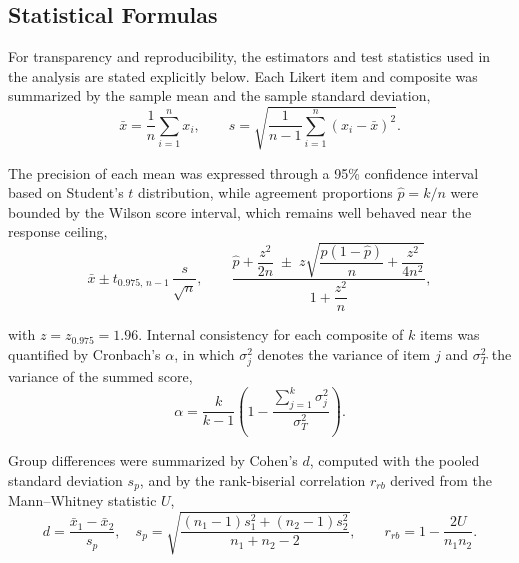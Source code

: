 \subsection{Statistical Formulas}

For transparency and reproducibility, the estimators and test statistics used in the analysis are stated explicitly below. Each Likert item and composite was summarized by the sample mean and the sample standard deviation,
\begin{equation}
  \label{eqn:mean_sd}
  \bar{x} = \frac{1}{n}\sum_{i=1}^{n} x_i,
  \qquad
  s = \sqrt{\frac{1}{n-1}\sum_{i=1}^{n}\left(x_i-\bar{x}\right)^2}.
\end{equation}
The precision of each mean was expressed through a 95\% confidence interval based on Student's $t$ distribution, while agreement proportions $\hat{p}=k/n$ were bounded by the Wilson score interval, which remains well behaved near the response ceiling,
\begin{equation}
  \label{eqn:ci_wilson}
  \bar{x} \pm t_{0.975,\,n-1}\,\frac{s}{\sqrt{n}},
  \qquad
  \frac{\hat{p}+\dfrac{z^2}{2n}\;\pm\; z\sqrt{\dfrac{\hat{p}\left(1-\hat{p}\right)}{n}+\dfrac{z^2}{4n^2}}}{1+\dfrac{z^2}{n}},
\end{equation}
with $z=z_{0.975}=1.96$. Internal consistency for each composite of $k$ items was quantified by Cronbach's $\alpha$, in which $\sigma^2_{j}$ denotes the variance of item $j$ and $\sigma^2_{T}$ the variance of the summed score,
\begin{equation}
  \label{eqn:cronbach}
  \alpha = \frac{k}{k-1}\left(1-\frac{\sum_{j=1}^{k}\sigma^2_{j}}{\sigma^2_{T}}\right).
\end{equation}
Group differences were summarized by Cohen's $d$, computed with the pooled standard deviation $s_p$, and by the rank-biserial correlation $r_{rb}$ derived from the Mann--Whitney statistic $U$,
\begin{equation}
  \label{eqn:cohend_rrb}
  d = \frac{\bar{x}_1-\bar{x}_2}{s_p},
  \quad
  s_p = \sqrt{\frac{(n_1-1)s_1^2+(n_2-1)s_2^2}{n_1+n_2-2}},
  \qquad
  r_{rb} = 1-\frac{2U}{n_1 n_2}.
\end{equation}
